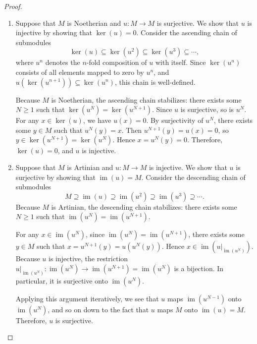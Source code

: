 \begin{proof}

	\begin{enumerate}
	    \item Suppose that $M$ is Noetherian and $u \colon M \to M$ is surjective. We show that $u$ is injective by showing that $\ker(u) = 0$. Consider the ascending chain of submodules
	    $$\ker(u) \subseteq \ker(u^2) \subseteq \ker(u^3) \subseteq \cdots,$$
	    where $u^n$ denotes the $n$-fold composition of $u$ with itself. Since $\ker(u^n)$ consists of all elements mapped to zero by $u^n$, and $u(\ker(u^{n+1})) \subseteq \ker(u^n)$, this chain is well-defined.

	    Because $M$ is Noetherian, the ascending chain stabilizes: there exists some $N \geq 1$ such that $\ker(u^N) = \ker(u^{N+1})$. Since $u$ is surjective, so is $u^N$. For any $x \in \ker(u)$, we have $u(x) = 0$. By surjectivity of $u^N$, there exists some $y \in M$ such that $u^N(y) = x$. Then $u^{N+1}(y) = u(x) = 0$, so $y \in \ker(u^{N+1}) = \ker(u^N)$. Hence $x = u^N(y) = 0$. Therefore, $\ker(u) = 0$, and $u$ is injective.

	    \item Suppose that $M$ is Artinian and $u \colon M \to M$ is injective. We show that $u$ is surjective by showing that $\operatorname{im}(u) = M$. Consider the descending chain of submodules
	    $$M \supseteq \operatorname{im}(u) \supseteq \operatorname{im}(u^2) \supseteq \operatorname{im}(u^3) \supseteq \cdots.$$
	    Because $M$ is Artinian, the descending chain stabilizes: there exists some $N \geq 1$ such that $\operatorname{im}(u^N) = \operatorname{im}(u^{N+1})$.

	    For any $x \in \operatorname{im}(u^N)$, since $\operatorname{im}(u^N) = \operatorname{im}(u^{N+1})$, there exists some $y \in M$ such that $x = u^{N+1}(y) = u(u^N(y))$. Hence $x \in \operatorname{im}(u|_{\operatorname{im}(u^N)})$. Because $u$ is injective, the restriction $u|_{\operatorname{im}(u^N)} \colon \operatorname{im}(u^N) \to \operatorname{im}(u^{N+1}) = \operatorname{im}(u^N)$ is a bijection. In particular, it is surjective onto $\operatorname{im}(u^N)$.

	    Applying this argument iteratively, we see that $u$ maps $\operatorname{im}(u^{N-1})$ onto $\operatorname{im}(u^N)$, and so on down to the fact that $u$ maps $M$ onto $\operatorname{im}(u) = M$. Therefore, $u$ is surjective.
	\end{enumerate}
\end{proof}

